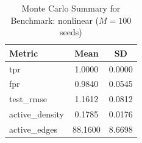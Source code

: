 \begin{table}[ht]
\centering
\caption{Monte Carlo Summary for Benchmark: nonlinear ($M = 100$ seeds)}
\begin{tabular}{lcc}
\hline
Metric & Mean & SD \\
\hline
tpr & 1.0000 & 0.0000 \\
fpr & 0.9840 & 0.0545 \\
test\_rmse & 1.1612 & 0.0812 \\
active\_density & 0.1785 & 0.0176 \\
active\_edges & 88.1600 & 8.6698 \\
\hline
\end{tabular}
\end{table}
